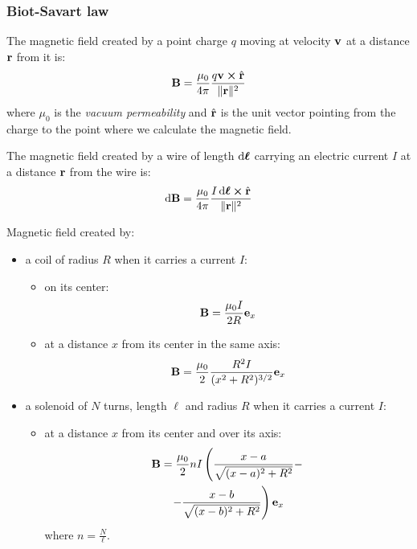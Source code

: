 \documentclass[../../../main_physics.tex]{subfiles}
\begin{document}
\begin{multicols}{2}
  \subsubsection{Biot-Savart law}
  \begin{proposition}
    The magnetic field created by a point charge $q$ moving at velocity $\boldsymbol{\mathrm{v}}$ at a distance $\boldsymbol{\mathrm{r}}$ from it is:
    $$\vf{B}=\frac{\mu_0}{4\pi}\frac{q\vf{v}\crossprod\Hat{\vf{r}}}{\|\vf{r}\|^2}$$ where $\mu_0$ is the \emph{vacuum permeability} and $\Hat{\boldsymbol{\mathrm{r}}}$ is the unit vector pointing from the charge to the point where we calculate the magnetic field.
  \end{proposition}
  \begin{law}
    The magnetic field created by a wire of length $\dd{\boldsymbol{\mathrm{\ell}}}$ carrying an electric current $I$ at a distance $\boldsymbol{\mathrm{r}}$ from the wire is: $$\dd{\vf{B}}=\frac{\mu_0}{4\pi}\frac{I\dd{\vf{\ell}}\crossprod\hat{\vf{r}}}{\|\vf{r}\|^2}$$
  \end{law}
  \begin{proposition}
    Magnetic field created by:
    \begin{itemize}
      \item a coil of radius $R$ when it carries a current $I$:
            \begin{itemize}
              \item on its center: $$\boldsymbol{\mathrm{B}}=\frac{\mu_0I}{2R}\boldsymbol{\mathrm{e}}_x$$
              \item at a distance $x$ from its center in the same axis: $$\boldsymbol{\mathrm{B}}=\frac{\mu_0}{2}\frac{R^2I}{(x^2+R^2)^{3/2}}\boldsymbol{\mathrm{e}}_x$$
            \end{itemize}
      \item a solenoid of $N$ turns, length $\ell$ and radius $R$ when it carries a current $I$:
            \begin{itemize}
              \item at a distance $x$ from its center and over its axis:
                    \begin{multline*} \boldsymbol{\mathrm{B}}=\frac{\mu_0}{2}nI\left(\frac{x-a}{\sqrt{(x-a)^2+R^2}}-\right.\\\left.-\frac{x-b}{\sqrt{(x-b)^2+R^2}}\right)\boldsymbol{\mathrm{e}}_x
                    \end{multline*} where $n=\frac{N}{\ell}$.
                    \begin{center}
                      \begin{minipage}{\linewidth}
                        \centering
                        

\end{minipage}
\end{center}
\end{itemize}
\end{itemize}
\end{proposition}
\end{multicols}
\end{document}
